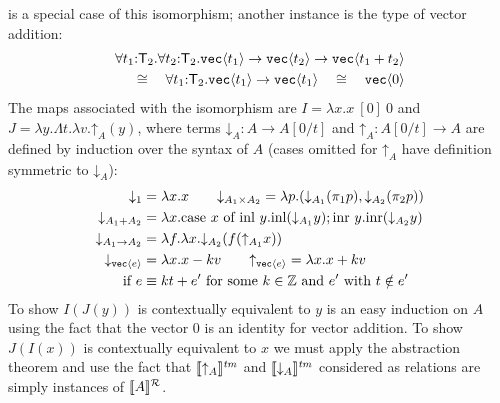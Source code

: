  is a special case of this isomorphism; another instance is the
type of vector addition:
\begin{eqnarray*}
\forall t_1\mathord:\mathsf{T}_2.\forall t_2\mathord:\mathsf{T}_2.\textup{\texttt{vec}}\langle t_1 \rangle\to\textup{\texttt{vec}}\langle t_2 \rangle\to\textup{\texttt{vec}}\langle t_1+t_2 \rangle\\
\cong\quad
\forall t_1\mathord:\mathsf{T}_2.\textup{\texttt{vec}}\langle t_1 \rangle\to\textup{\texttt{vec}}\langle t_1 \rangle\quad\cong\quad
\textup{\texttt{vec}}\langle 0 \rangle
\end{eqnarray*}
\noindent
\newcommand{\transup}[1]{\mathord\uparrow_{#1}}
\newcommand{\transdn}[1]{\mathord\downarrow_{#1}}
The maps associated with the isomorphism are 
$I = \lambda x. x\ [0]\ 0$ and $J = \lambda y. \Lambda t.\lambda v. \transup A (y)$,
where terms $\transdn A : A\to A[0/t]$ and $\transup A : A[0/t] \to A$ are defined by induction over the syntax of $A$ (cases omitted for $\transup A$ have definition symmetric to $\transdn A$):
\begin{align*}
\transdn{1} &= \lambda x. x \qquad
\transdn{A_1\times A_2} = \lambda p. (\transdn{A_1}(\pi_1 p),\transdn{A_2}(\pi_2 p))\\ 
\transdn{A_1 + A_2} &= \lambda x.
\textrm{case}\ x\ \textrm{of}\ \textrm{inl}\ y.\textrm{inl}(\transdn{A_1}y); \textrm{inr}\ y.\textrm{inr}(\transdn{A_2}y)\\ 
\transdn{A_1\to A_2} &= \lambda f. \lambda x. \transdn{A_2} (f(\transup{A_1}x))\\ 
\transdn{\tyPrim{vec}{e}} &= \lambda x. x - kv \qquad
\transup{\tyPrim{vec}{e}} = \lambda x. x + kv\\ 
\text{ if }e & \equiv k t + e' \text{ for
  some }k\in\setOfIntegers \text{ and }e'\text{ with }t\notin e'
\end{align*}
To show $I(J(y))$ is contextually equivalent to $y$ is an easy
induction on $A$ using the fact that the vector $0$
is an identity for vector addition. To show $J(I(x))$ is contextually
equivalent to $x$ we must apply the abstraction theorem and use
the fact that $\tmSem{\transup A}$ and $\tmSem{\transdn A}$ 
considered as relations are simply instances of $\llbracket A \rrbracket^{\mathcal{R}}_{}{}$.

